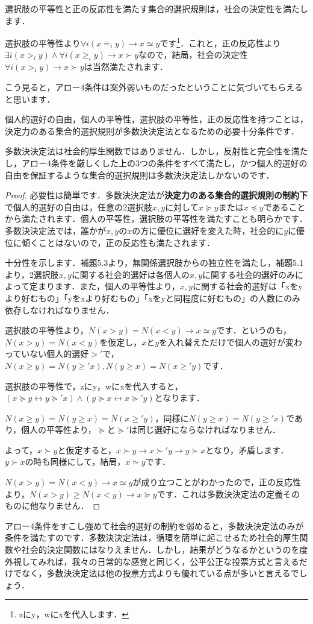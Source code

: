 \begin{lem}
    選択肢の平等性と正の反応性を満たす集合的選択規則は，社会の決定性を満たします．
\end{lem}

選択肢の平等性より$\forall i (x \doteq_i y) \to x \simeq y$です\footnote{zにy，wにxを代入します．}．これと，正の反応性より$\exists i (x >_i y) \land \forall i (x \geq_i y) \to x \succ y$なので，結局，社会の決定性$\forall i (x >_i y) \to x \succ y$は当然満たされます．

こう見ると，アロー4条件は案外弱いものだったということに気づいてもらえると思います．

\begin{thm}
    個人的選好の自由，個人の平等性，選択肢の平等性，正の反応性を持つことは，決定力のある集合的選択規則が多数決決定法となるための必要十分条件です．
\end{thm}

多数決決定法は社会的厚生関数ではありません．しかし，反射性と完全性を満たし，アロー4条件を厳しくした上の3つの条件をすべて満たし，かつ個人的選好の自由を保証するような集合的選択規則は多数決決定法しかないのです．

\begin{proof}
必要性は簡単です．多数決決定法が{\bf 決定力のある集合的選択規則の制約下}で個人的選好の自由は，任意の2選択肢$x,y$に対して$x \succeq y$または$x \preceq y$であることから満たされます．個人の平等性，選択肢の平等性を満たすことも明らかです．多数決決定法では，誰かが$x,y$の$x$の方に優位に選好を変えた時，社会的に$y$に優位に傾くことはないので，正の反応性も満たされます．

十分性を示します．補題5.3より，無関係選択肢からの独立性を満たし，補題5.1より，2選択肢$x,y$に関する社会的選好は各個人の$x,y$に関する社会的選好のみによって定まります．また，個人の平等性より，$x,y$に関する社会的選好は「xをyより好むもの」「yをxより好むもの」「xをyと同程度に好むもの」の人数にのみ依存しなければなりません．

選択肢の平等性より，$N(x > y) = N(x < y) \to x \simeq y$です．というのも，$N(x > y) = N(x < y)$を仮定し，$x$と$y$を入れ替えただけで個人の選好が変わっていない個人的選好$>'$で，$N(x \geq y) = N(y \geq' x), N(y \geq x) = N(x \geq' y)$です．

選択肢の平等性で，zにy，wにxを代入すると，$(x \succeq y \leftrightarrow y \succeq' x) \land (y \succeq x \leftrightarrow x \succeq' y)$となります．

$N(x \geq y) = N(y \geq x) = N(x \geq' y)$，同様に$N(y \geq x) = N(y \geq' x)$であり，個人の平等性より，$\succeq$と$\succeq'$は同じ選好にならなければなりません．

よって，$x \succ y$と仮定すると，$x \succ y \to x \succ' y \to y \succ x$となり，矛盾します．$y \succ x$の時も同様にして，結局，$x \simeq y$です．

$N(x > y) = N(x < y) \to x \simeq y$が成り立つことがわかったので，正の反応性より，$N(x > y) \geq N(x < y) \to x \succeq y$です．これは多数決決定法の定義そのものに他なりません．
\end{proof}

アロー4条件をすこし強めて社会的選好の制約を弱めると，多数決決定法のみが条件を満たすのです．多数決決定法は，循環を簡単に起こせるため社会的厚生関数や社会的決定関数にはなりえません．しかし，結果がどうなるかというのを度外視してみれば，我々の日常的な感覚と同じく，公平公正な投票方式と言えるだけでなく，多数決決定法は他の投票方式よりも優れている点が多いと言えるでしょう．

